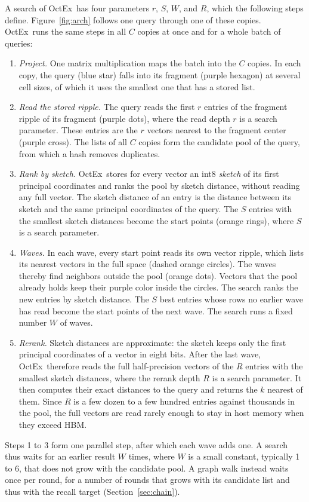 \documentclass[letterpaper,twocolumn,10pt]{article}
\newcommand{\sysname}{OctEx}
\begin{document}
A search of \sysname\ has four parameters $r$, $S$, $W$, and $R$, which the following steps define. Figure~\ref{fig:arch} follows one query through one of these copies. \sysname\ runs the same steps in all $C$ copies at once and for a whole batch of queries:
\begin{enumerate}
  \item \emph{Project.} One matrix multiplication maps the batch into the $C$ copies. In each copy, the query (blue star) falls into its fragment (purple hexagon) at several cell sizes, of which it uses the smallest one that has a stored list.
  \item \emph{Read the stored ripple.} The query reads the first $r$ entries of the fragment ripple of its fragment (purple dots), where the read depth $r$ is a search parameter. These entries are the $r$ vectors nearest to the fragment center (purple cross). The lists of all $C$ copies form the candidate pool of the query, from which a hash removes duplicates.
  \item \emph{Rank by sketch.} \sysname\ stores for every vector an int8 \emph{sketch} of its first principal coordinates and ranks the pool by sketch distance, without reading any full vector. The sketch distance of an entry is the distance between its sketch and the same principal coordinates of the query. The $S$ entries with the smallest sketch distances become the start points (orange rings), where $S$ is a search parameter.
  \item \emph{Waves.} In each wave, every start point reads its own vector ripple, which lists its nearest vectors in the full space (dashed orange circles). The waves thereby find neighbors outside the pool (orange dots). Vectors that the pool already holds keep their purple color inside the circles. The search ranks the new entries by sketch distance. The $S$ best entries whose rows no earlier wave has read become the start points of the next wave. The search runs a fixed number $W$ of waves.
  \item \emph{Rerank.} Sketch distances are approximate: the sketch keeps only the first principal coordinates of a vector in eight bits. After the last wave, \sysname\ therefore reads the full half-precision vectors of the $R$ entries with the smallest sketch distances, where the rerank depth $R$ is a search parameter. It then computes their exact distances to the query and returns the $k$ nearest of them. Since $R$ is a few dozen to a few hundred entries against thousands in the pool, the full vectors are read rarely enough to stay in host memory when they exceed HBM.
\end{enumerate}
Steps 1 to 3 form one parallel step, after which each wave adds one. A search thus waits for an earlier result $W$ times, where $W$ is a small constant, typically 1 to 6, that does not grow with the candidate pool. A graph walk instead waits once per round, for a number of rounds that grows with its candidate list and thus with the recall target (Section~\ref{sec:chain}).
\end{document}
